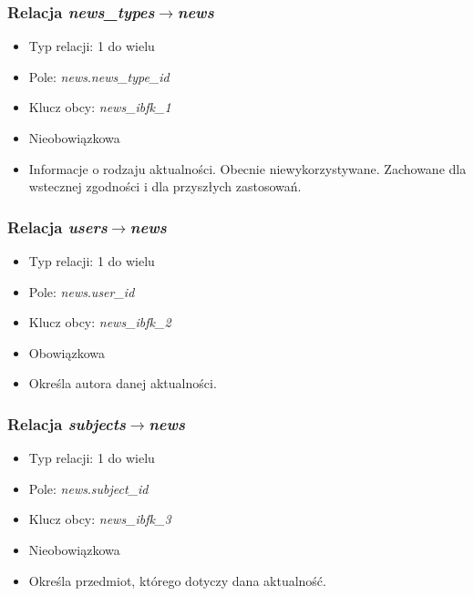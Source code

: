 \documentclass[a4paper,12pt,oneside]{report}
\begin{document}
\subsubsection{Relacja \emph{news\_types}$\to$\emph{news}}
\label{subsub:news_types-news}
\begin{itemize}
  \item Typ relacji: 1 do wielu
  \item Pole: \emph{news}.\emph{news\_type\_id}
  \item Klucz obcy: \emph{news\_ibfk\_1}
  \item Nieobowiązkowa
  \item Informacje o rodzaju aktualności. Obecnie niewykorzystywane. Zachowane dla wstecznej zgodności i dla przyszłych zastosowań.
\end{itemize}

\subsubsection{Relacja \emph{users}$\to$\emph{news}}
\label{subsub:users-news}
\begin{itemize}
  \item Typ relacji: 1 do wielu
  \item Pole: \emph{news}.\emph{user\_id}
  \item Klucz obcy: \emph{news\_ibfk\_2}
  \item Obowiązkowa
  \item Określa autora danej aktualności.
\end{itemize}

\subsubsection{Relacja \emph{subjects}$\to$\emph{news}}
\label{subsub:subjects-news}
\begin{itemize}
  \item Typ relacji: 1 do wielu
  \item Pole: \emph{news}.\emph{subject\_id}
  \item Klucz obcy: \emph{news\_ibfk\_3}
  \item Nieobowiązkowa
  \item Określa przedmiot, którego dotyczy dana aktualność.
\end{itemize}
\end{document}
